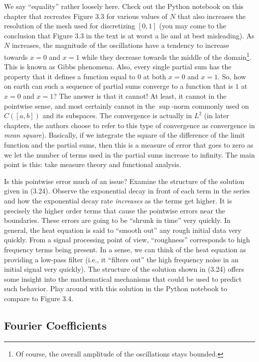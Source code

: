 \documentclass{amsart}
\theoremstyle{plain}
\theoremstyle{definition}
\theoremstyle{remark}
\theoremstyle{definition}
\numberwithin{equation}{section}
\numberwithin{equation}{section}
\begin{document}
We say ``equality'' rather loosely here. 
Check out the Python notebook on this chapter that recreates Figure 3.3 for various values of $N$ that also increases the resolution of the mesh used for discretizing $[0,1]$ (you may come to the conclusion that Figure 3.3 in the text is at worst a lie and at best misleading). 
As $N$ increases, the magnitude of the oscillations have a tendency to increase towards $x=0$ and $x=1$ while they decrease towards the middle of the domain\footnote{Of course, the overall amplitude of the oscillations stays bounded.}. 
This is known as Gibbs phenomena.
Also, every single partial sum has the property that it defines a function equal to $0$ at both $x=0$ and $x=1$.
So, how on earth can such a sequence of partial sums converge to a function that is $1$ at $x=0$ and $x=1$?
The answer is that it cannot!
At least, it cannot in the pointwise sense, and most certainly cannot in the $\sup$-norm commonly used on $C([a,b])$ and its subspaces.
The convergence is actually in $L^2$ (in later chapters, the authors choose to refer to this type of convergence as convergence in {\em mean square}). 
Basically, if we integrate the square of the difference of the limit function and the partial sums, then this is a measure of error that goes to zero as we let the number of terms used in the partial sums increase to infinity. 
The main point is this: take measure theory and functional analysis. 

Is this pointwise error much of an issue?
Examine the structure of the solution given in (3.24).
Observe the exponential decay in front of each term in the series and how the exponential decay rate {\em increases} as the terms get higher.
It is precisely the higher order terms that cause the pointwise errors near the boundaries.
These errors are going to be ``shrunk in time'' very quickly.
In general, the heat equation is said to ``smooth out'' any rough initial data very quickly.
From a signal processing point of view, ``roughness'' corresponds to high frequency terms being present. 
In a sense, we can think of the heat equation as providing a low-pass filter (i.e., it ``filters out'' the high frequency noise in an initial signal very quickly).  
The structure of the solution shown in (3.24) offers some insight into the mathematical mechanisms that could be used to predict such behavior. 
Play around with this solution in the Python notebook to compare to Figure 3.4.

\subsection{Fourier Coefficients}
\end{document}
